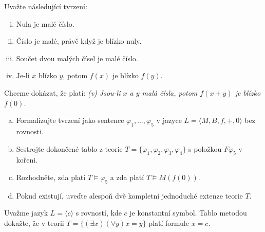 \begin{problem}

    Uvažte následující tvrzení:
    \begin{enumerate}[(i)] \it 
        \item Nula je malé číslo.
        \item Číslo je malé, právě když je blízko nuly.
        \item Součet dvou malých čísel je malé číslo.
        \item Je-li $x$ blízko $y$, potom $f(x)$ je blízko $f(y)$.
    \end{enumerate}

    Chceme dokázat, že platí: {\it (v) Jsou-li $x$ a $y$ malá čísla, potom $f(x+y)$ je blízko $f(0)$.}

    \begin{enumerate}[(a)]
        \item Formalizujte tvrzení jako sentence $\varphi_1,\dots,\varphi_5$ v jazyce $L=\langle M,B,f,+,0\rangle$ bez rovnosti.        
        \item Sestrojte dokončené tablo z teorie $T=\{\varphi_1,\varphi_2,\varphi_3,\varphi_4\}$ s položkou $F\varphi_5$ v kořeni.        
        \item Rozhodněte, zda platí $T\models \varphi_5$ a zda platí $T\models M(f(0))$.
        \item Pokud existují, uveďte alespoň dvě kompletní jednoduché extenze teorie $T$.
    \end{enumerate}

    \begin{solution}
                    
    \end{solution}

\end{problem}


\begin{problem} %

    Uvažme jazyk $L=\langle c\rangle$ s rovností, kde $c$ je konstantní symbol. Tablo metodou dokažte, že v teorii $T=\{(\exists x)(\forall y)x=y\}$ platí formule $x=c$.

    \begin{solution}
                    
    \end{solution}

\end{problem}


